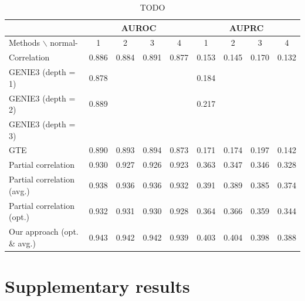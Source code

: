 \documentclass[wcp]{jmlr}
\begin{document}
\begin{table}
\small
\centering
\begin{tabular}{@{}l *{8}{c}@{}}
  & \multicolumn{4}{c}{AUROC} & \multicolumn{4}{c}{AUPRC} \\
\hline \hline
Methods $\backslash$ normal- & 1 & 2 & 3 & 4 & 1 & 2 & 3 & 4 \\
\hline \hline
Correlation            & 0.886 & 0.884 & 0.891 & 0.877 & 0.153 & 0.145 & 0.170 & 0.132 \\
GENIE3 (depth = 1)     & 0.878 & & & & 0.184 & & & \\
GENIE3 (depth = 2)     & 0.889 & & & & 0.217 & & & \\
GENIE3 (depth = 3)     & & & & & & & & \\
GTE                    & 0.890 & 0.893 & 0.894 & 0.873 & 0.171 & 0.174 & 0.197 & 0.142 \\
Partial correlation    & 0.930 &  0.927 &  0.926 &  0.923& 0.363  & 0.347 &  0.346 & 0.328 \\
Partial correlation (avg.) & 0.938 & 0.936 & 0.936 & 0.932& 0.391 & 0.389 & 0.385 & 0.374\\
Partial correlation (opt.) & 0.932 & 0.931 & 0.930 & 0.928 & 0.364 & 0.366 & 0.359 & 0.344 \\
Our approach (opt. \& avg.)    & 0.943 & 0.942 & 0.942 & 0.939 & 0.403 & 0.404 & 0.398 & 0.388 \\
\end{tabular}
\caption{TODO}
\label{tab:tab1}
\end{table}


\section{Supplementary results}
\end{document}
